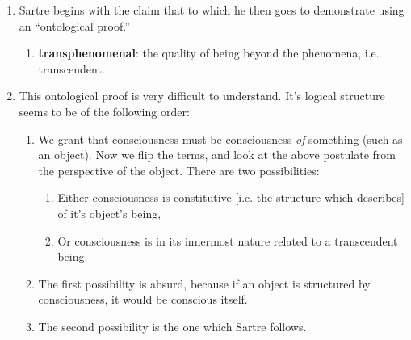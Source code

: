 \begin{enumerate}
  \item Sartre begins with the claim that  to which he then goes to demonstrate using an \enquote{ontological proof.}
  \begin{enumerate}
    \item \textbf{transphenomenal}: the quality of being beyond the phenomena, i.e. transcendent.
  \end{enumerate}
  \item This ontological proof is very difficult to understand. It's logical structure seems to be of the following order:
  \begin{enumerate}
    \item We grant that consciousness must be consciousness \emph{of} something (such as an object). Now we flip the terms, and look at the above postulate from the perspective of the object. There are two possibilities:
    \begin{enumerate}
      \item Either consciousness is constitutive [i.e. the structure which describes] of it's object's being,
      \item Or consciousness is in its innermost nature related to a transcendent being.
    \end{enumerate}
    \item The first possibility is absurd, because if an object is structured by consciousness, it would be conscious itself.
    \item The second possibility is the one which Sartre follows.
  \end{enumerate}

\end{enumerate}
